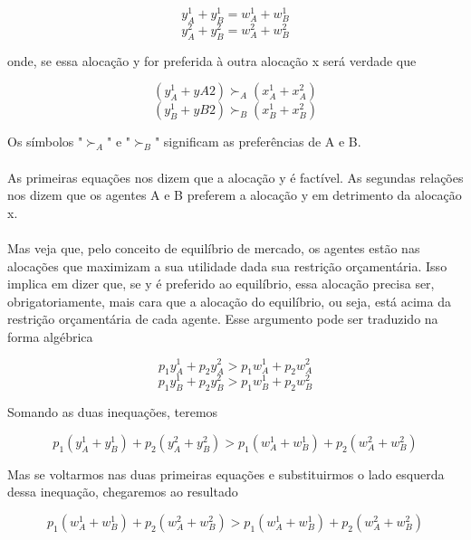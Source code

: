 \documentclass[a4paper,11pt,oneside]{book}
\theoremstyle{definition}
\theoremstyle{break}
\begin{document}
\newpage

$$y_A^1 + y_B^1 = w_A^1 + w_ B^1$$
$$y_A^2 + y_B^2 = w_A^2 + w_ B^2$$

onde, se essa alocação y for preferida à outra alocação x será verdade que

$$(y_A^1 + yA2) \succ_A (x_A^1 + x_A^2)$$
$$(y_B^1 + yB2) \succ_B (x_B^1 + x_B^2)$$

Os símbolos "$\succ_A$" e "$\succ_B$" significam as preferências de A e B.
\\
\\
As primeiras equações nos dizem que a alocação y é factível. As segundas relações nos dizem que os agentes A e B preferem a alocação y em detrimento da alocação x.
\\
\\
Mas veja que, pelo conceito de equilíbrio de mercado, os agentes estão nas alocações que maximizam a sua utilidade dada sua restrição orçamentária. Isso implica em dizer que, se y é preferido ao equilíbrio, essa alocação precisa ser, obrigatoriamente, mais cara que a alocação do equilíbrio, ou seja, está acima da restrição orçamentária de cada agente. Esse argumento pode ser traduzido na forma algébrica

$$p_1y_A^1 + p_2y_A^2 > p_1w_A^1 + p_2w_A^2$$
$$p_1y_B^1 + p_2y_B^2 > p_1w_B^1 + p_2w_B^2$$

Somando as duas inequações, teremos

$$p_1(y_A^1 + y_B^1) + p_2(y_A^2 + y_B^2) > p_1(w_A^1 + w_ B^1) + p_2(w_A^2 + w_ B^2)$$

Mas se voltarmos nas duas primeiras equações e substituirmos o lado esquerda dessa inequação, chegaremos ao resultado

$$p_1(w_A^1 + w_ B^1) + p_2(w_A^2 + w_ B^2) > p_1(w_A^1 + w_ B^1) + p_2(w_A^2 + w_ B^2)$$
\end{document}

